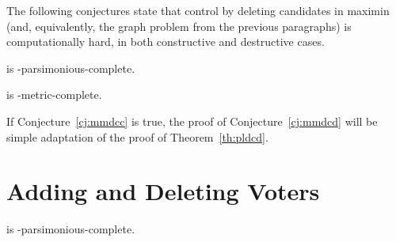 The following conjectures state that control by deleting candidates in maximin (and, equivalently, the graph problem from the previous paragraphs) is computationally hard, in both constructive and destructive cases.

\begin{conjecture} \label{cj:mmdcc}
	 is \sharpPclass-parsimonious-complete.
\end{conjecture}

\begin{conjecture} \label{cj:mmdcd}
	 is \sharpPclass-metric-complete.
\end{conjecture}

If Conjecture~\ref{cj:mmdcc} is true, the proof of Conjecture~\ref{cj:mmdcd} will be simple adaptation of the proof of Theorem~\ref{th:pldcd}.

\section{Adding and Deleting Voters} \label{sec:mmvot}

\begin{theorem} \label{th:mmavc}
	 is \sharpPclass-parsimonious-complete.
\end{theorem}

